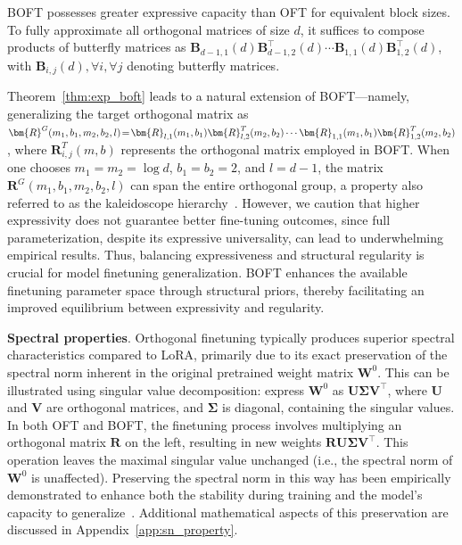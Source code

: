 \begin{theorem}\label{thm:exp_boft}
    BOFT possesses greater expressive capacity than OFT for equivalent block sizes. To fully approximate all orthogonal matrices of size $d$, it suffices to compose products of butterfly matrices as $\bm{B}_{d-1,1}(d)\bm{B}^\top_{d-1,2}(d)\cdots\bm{B}_{1,1}(d)\bm{B}^\top_{1,2}(d)$, with $\bm{B}_{i,j}(d),\forall i,\forall j$ denoting butterfly matrices.
\end{theorem}

Theorem~\ref{thm:exp_boft} leads to a natural extension of BOFT—namely, generalizing the target orthogonal matrix as $\thickmuskip=2mu \medmuskip=2mu \bm{R}^G(m_1,b_1,m_2,b_2,l)=\bm{R}_{l,1}(m_1,b_1)\bm{R}_{l,2}^T(m_2,b_2)\cdots\bm{R}_{1,1}(m_1,b_1)\bm{R}_{1,2}^T(m_2,b_2)$, where $\bm{R}_{i,j}^T(m,b)$ represents the orthogonal matrix employed in BOFT. When one chooses $m_1=m_2=\log d$, $b_1=b_2=2$, and $l=d-1$, the matrix $\bm{R}^G(m_1,b_1,m_2,b_2,l)$ can span the entire orthogonal group, a property also referred to as the kaleidoscope hierarchy~\cite{dao2019kaleidoscope}. However, we caution that higher expressivity does not guarantee better fine-tuning outcomes, since full parameterization, despite its expressive universality, can lead to underwhelming empirical results. Thus, balancing expressiveness and structural regularity is crucial for model finetuning generalization. BOFT enhances the available finetuning parameter space through structural priors, thereby facilitating an improved equilibrium between expressivity and regularity.

\textbf{Spectral properties}. Orthogonal finetuning typically produces superior spectral characteristics compared to LoRA, primarily due to its exact preservation of the spectral norm inherent in the original pretrained weight matrix $\bm{W}^0$. This can be illustrated using singular value decomposition: express $\bm{W}^0$ as $\bm{U}\bm{\Sigma}\bm{V}^\top$, where $\bm{U}$ and $\bm{V}$ are orthogonal matrices, and $\bm{\Sigma}$ is diagonal, containing the singular values. In both OFT and BOFT, the finetuning process involves multiplying an orthogonal matrix $\bm{R}$ on the left, resulting in new weights $\bm{R}\bm{U}\bm{\Sigma}\bm{V}^\top$. This operation leaves the maximal singular value unchanged (i.e., the spectral norm of $\bm{W}^0$ is unaffected). Preserving the spectral norm in this way has been empirically demonstrated to enhance both the stability during training and the model’s capacity to generalize~\cite{miyato2018spectral,yoshida2017spectral}. Additional mathematical aspects of this preservation are discussed in Appendix~\ref{app:sn_property}.

